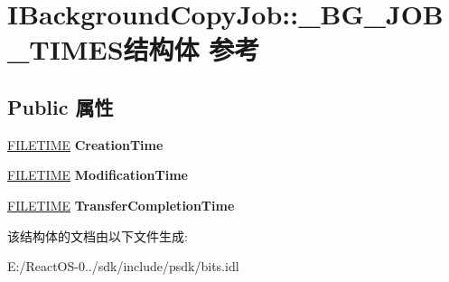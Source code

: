 \hypertarget{struct_i_background_copy_job_1_1___b_g___j_o_b___t_i_m_e_s}{}\section{I\+Background\+Copy\+Job\+:\+:\+\_\+\+B\+G\+\_\+\+J\+O\+B\+\_\+\+T\+I\+M\+E\+S结构体 参考}
\label{struct_i_background_copy_job_1_1___b_g___j_o_b___t_i_m_e_s}
\subsection*{Public 属性}
\begin{DoxyCompactItemize}
\item 
\mbox{\label{struct_i_background_copy_job_1_1___b_g___j_o_b___t_i_m_e_s_a6801cfad94743553d8ad4bff68c3ebd3}} 
\hyperlink{struct___f_i_l_e_t_i_m_e}{F\+I\+L\+E\+T\+I\+ME} {\bfseries Creation\+Time}
\item 
\mbox{\label{struct_i_background_copy_job_1_1___b_g___j_o_b___t_i_m_e_s_a78cfe2b790add950917ddf8c59ced311}} 
\hyperlink{struct___f_i_l_e_t_i_m_e}{F\+I\+L\+E\+T\+I\+ME} {\bfseries Modification\+Time}
\item 
\mbox{\label{struct_i_background_copy_job_1_1___b_g___j_o_b___t_i_m_e_s_adc98f9355852b10703dd904158eda5b6}} 
\hyperlink{struct___f_i_l_e_t_i_m_e}{F\+I\+L\+E\+T\+I\+ME} {\bfseries Transfer\+Completion\+Time}
\end{DoxyCompactItemize}


该结构体的文档由以下文件生成\+:\begin{DoxyCompactItemize}
\item 
E\+:/\+React\+O\+S-\/0../sdk/include/psdk/bits.\+idl\end{DoxyCompactItemize}
